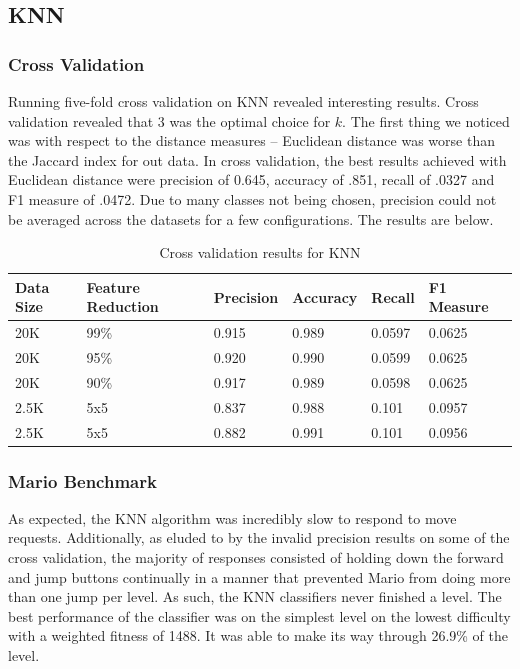 \documentclass[]{article}   %
\begin{document}
\subsection{KNN}
\subsubsection{Cross Validation}
Running five-fold cross validation on KNN revealed interesting results. Cross validation revealed that 3 was the optimal
choice for $k$. The first thing we noticed was with respect to the distance measures -- Euclidean distance was worse than
the Jaccard index for out data. In cross validation, the best results achieved with Euclidean distance were precision of 0.645,
accuracy of .851, recall of .0327 and F1 measure of .0472. Due to many classes not being chosen, precision could not be averaged
across the datasets for a few configurations. The results are below.

\begin{table}[h!]
	\begin{center}
		\caption{Cross validation results for KNN}
		\begin{tabular}{l | l || l | l | l | l }
		Data Size & Feature Reduction & Precision & Accuracy & Recall & F1 Measure \\
		\hline
		20K & 99\% & 0.915 & 0.989 & 0.0597 & 0.0625 \\
		20K & 95\% & 0.920 & 0.990 & 0.0599 & 0.0625 \\
		20K & 90\% & 0.917 & 0.989 & 0.0598 & 0.0625 \\
		2.5K & 5x5 & 0.837 & 0.988 & 0.101 & 0.0957 \\
		2.5K & 5x5 & 0.882 & 0.991 & 0.101 & 0.0956 \\
		\hline
		\end{tabular}
	\end{center}
\end{table}

\subsubsection{Mario Benchmark}
As expected, the KNN algorithm was incredibly slow to respond to move requests. Additionally, as eluded to by the invalid precision
results on some of the cross validation, the majority of responses consisted of holding down the forward and jump buttons continually
in a manner that prevented Mario from doing more than one jump per level. As such, the KNN classifiers never finished a level. The best
performance of the classifier was on the simplest level on the lowest difficulty with a weighted fitness of 1488. It was able to make its
way through 26.9\% of the level.
\end{document}
